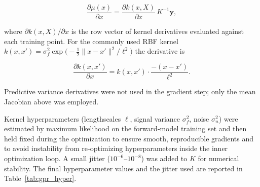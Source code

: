 \documentclass[11pt]{article}
\begin{document}
\[
\frac{\partial \mu(x)}{\partial x}
= \frac{\partial k(x,X)}{\partial x}\,K^{-1}\mathbf{y},
\]


where \(\partial k(x,X)/\partial x\) is the row vector of kernel derivatives evaluated against each training point. For the commonly used RBF kernel \(k(x,x')=\sigma_f^2\exp\big(-\tfrac{1}{2}\|x-x'\|^2/\ell^2\big)\) the derivative is


\[
\frac{\partial k(x,x')}{\partial x} = k(x,x')\cdot\frac{-(x-x')}{\ell^2}.
\]


Predictive variance derivatives were not used in the gradient step; only the mean Jacobian above was employed.

Kernel hyperparameters (lengthscales \(\ell\), signal variance \(\sigma_f^2\), noise \(\sigma_n^2\)) were estimated by maximum likelihood on the forward‑model training set and then held fixed during the optimization to ensure smooth, reproducible gradients and to avoid instability from re‑optimizing hyperparameters inside the inner optimization loop. A small jitter (\(10^{-6}\)–\(10^{-8}\)) was added to \(K\) for numerical stability. The final hyperparameter values and the jitter used are reported in Table~\ref{tab:gpr_hyper}.




\begin{table}[htbp]
\centering
\caption{GPR kernel hyperparameters estimated by MLE on the forward-model training set and held fixed during optimization.}
\label{tab:gpr_hyper}
\end{table}
\end{document}
